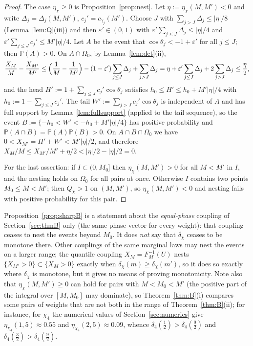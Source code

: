 \documentclass[11pt]{amsart}
\theoremstyle{definition}
\numberwithin{equation}{section}
\newcommand{\eps}{\varepsilon}
\newcommand{\PP}{\mathbb P}
\begin{document}
\begin{proof}
The case $\eta_\chi\ge0$ is Proposition~\ref{prop:nest}. Let
$\eta:=\eta_\chi(M,M')<0$ and write $\Delta_j=\Delta_j(M,M')$,
$c_j'=c_{\gamma_j}(M')$. Choose $J$ with
$\sum_{j>J}\Delta_j\le|\eta|/8$ (Lemma~\ref{lem:Q}(iii)) and then
$\eps'\in(0,1)$ with
$\eps'\sum_{j\le J}\Delta_j\le|\eta|/4$ and
$\eps'\sum_{j\le J}c_j'\le M'|\eta|/4$. Let $A$ be the event that
$\cos\theta_j<-1+\eps'$ for all $j\le J$; then $\PP(A)>0$. On
$A\cap\Omega_0$, by Lemma~\ref{lem:det}(ii),
\[
\frac{X_M}{M}-\frac{X_{M'}}{M'}
\le\Bigl(\frac1M-\frac1{M'}\Bigr)-(1-\eps')\sum_{j\le J}\Delta_j
+\sum_{j>J}\Delta_j
=\eta+\eps'\sum_{j\le J}\Delta_j+2\sum_{j>J}\Delta_j
\le\frac{\eta}{2} ,
\]
and the head $H':=1+\sum_{j\le J}c_j'\cos\theta_j$ satisfies
$h_0\le H'\le h_0+M'|\eta|/4$ with $h_0:=1-\sum_{j\le J}c_j'$. The
tail $W':=\sum_{j>J}c_j'\cos\theta_j$ is independent of $A$ and has
full support by Lemma~\ref{lem:fullsupport} (applied to the tail
sequence), so the event
$B:=\{-h_0<W'<-h_0+M'|\eta|/4\}$ has positive probability and
$\PP(A\cap B)=\PP(A)\PP(B)>0$. On $A\cap B\cap\Omega_0$ we have
$0<X_{M'}=H'+W'<M'|\eta|/2$, and therefore
$X_M/M\le X_{M'}/M'+\eta/2<|\eta|/2-|\eta|/2=0$.

For the last assertion: if $I\subset(0,M_0]$ then $\eta_\chi(M,M')>0$
for all $M<M'$ in $I$, and the nesting holds on $\Omega_0$ for all
pairs at once. Otherwise $I$ contains two points $M_0\le M<M'$; then $Q_\chi>1$ on $(M,M')$, so $\eta_\chi(M,M')<0$
and nesting fails with positive probability for this pair.
\end{proof}

Proposition~\ref{prop:sharpB} is a statement about the
\emph{equal-phase} coupling of Section~\ref{sec:thmB} only (the same
phase vector for every weight): that coupling ceases to nest the
events beyond $M_0$. It does \emph{not} say that $\delta_\chi$ ceases
to be monotone there. Other couplings of the same marginal laws may
nest the events on a larger range; the quantile coupling
$X_M=F_M^{-1}(U)$ nests $\{X_{M'}>0\}\subset\{X_M>0\}$ exactly when
$\delta_\chi(m)\ge\delta_\chi(m')$, so it does so exactly where
$\delta_\chi$ is monotone, but it gives no means of proving
monotonicity. Note also that
$\eta_\chi(M,M')\ge0$ can hold for pairs with $M<M_0<M'$ (the
positive part of the integral over $[M,M_0]$ may dominate), so
Theorem~\ref{thm:B}(i) compares some pairs of weights that are not
both in the range of Theorem~\ref{thm:B}(ii); for instance, for
$\chi_4$ the numerical values of Section~\ref{sec:numerics} give
$\eta_{\chi_4}(1,5)\approx0.55$ and $\eta_{\chi_4}(2,5)\approx0.09$,
whence $\delta_4(\tfrac12)>\delta_4(\tfrac92)$ and
$\delta_4(\tfrac32)>\delta_4(\tfrac92)$.
\end{document}
